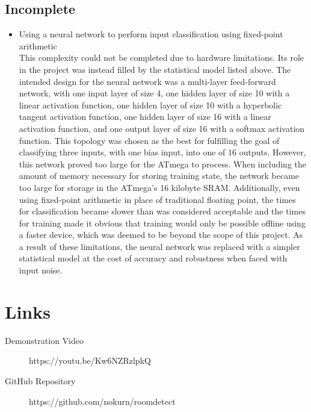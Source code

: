 \documentclass{article}
\begin{document}
\subsection{Incomplete}

\begin{itemize}

  \item Using a neural network to perform input classification using
    fixed-point arithmetic \\
    This complexity could not be completed due to hardware limitations.
    Its role in the project was instead filled by the statistical model
    listed above.  The intended design for the neural network was a
    multi-layer feed-forward network, with one input layer of size 4,
    one hidden layer of size 10 with a linear activation function, one
    hidden layer of size 10 with a hyperbolic tangent activation
    function, one hidden layer of size 16 with a linear activation
    function, and one output layer of size 16 with a softmax activation
    function.  This topology was chosen as the best for fulfilling the
    goal of classifying three inputs, with one bias input, into one of
    16 outputs.  However, this network proved too large for the ATmega
    to process.  When including the amount of memory necessary for
    storing training state, the network became too large for storage in
    the ATmega's 16 kilobyte SRAM.  Additionally, even using fixed-point
    arithmetic in place of traditional floating point, the times for
    classification became slower than was considered acceptable and the
    times for training made it obvious that training would only be
    possible offline using a faster device, which was deemed to be
    beyond the scope of this project.  As a result of these limitations,
    the neural network was replaced with a simpler statistical model at
    the cost of accuracy and robustness when faced with input noise.

\end{itemize}

\section{Links}

\begin{description}

  \item [Demonstration Video] https://youtu.be/Kw6NZRzlpkQ

  \item [GitHub Repository] https://github.com/nokurn/roomdetect

\end{description}
\end{document}
